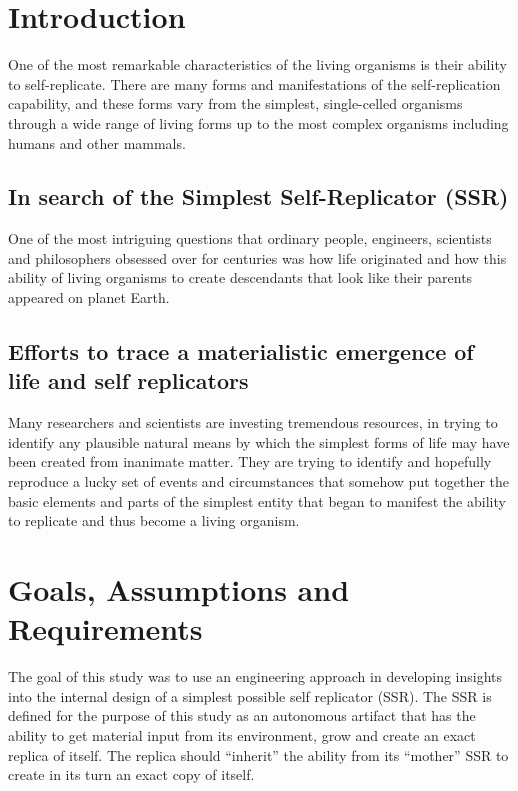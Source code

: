 \section{Introduction}

One of the most remarkable characteristics of the living organisms is
their ability to self-replicate. There are many forms and
manifestations of the self-replication capability, and these forms vary
from the simplest, single-celled organisms through a wide range of
living forms up to the most complex organisms including humans and
other mammals.

\subsection[In search of the Simplest Self{}-Replicator (SSR)]{In search
of the Simplest Self-Replicator (SSR)}

One of the most intriguing questions that ordinary people, engineers,
scientists and philosophers obsessed over for centuries was how life
originated and how this ability of living organisms to create
descendants that look like their parents appeared on planet Earth. 

\subsection[Efforts to trace a materialistic emergence of life and self
replicators]{Efforts to trace a materialistic emergence of life and
self replicators}

Many researchers and scientists
are investing tremendous resources, in trying to identify any plausible
natural means by which the simplest forms of life may have been created
from inanimate matter. They are trying to identify and hopefully
reproduce a lucky set of events and circumstances that somehow put
together the basic elements and parts of the simplest entity that began
to manifest the ability to replicate and thus become a living organism.

\section{Goals, Assumptions and Requirements}

The goal of this study was to use an engineering approach in developing
insights into the internal design of a simplest possible self
replicator (SSR). The SSR is defined for the purpose of this study as
an autonomous artifact that has the ability to get material input from
its environment, grow and create an exact replica of itself. The
replica should “inherit” the ability from its “mother” SSR to create in
its turn an exact copy of itself.


